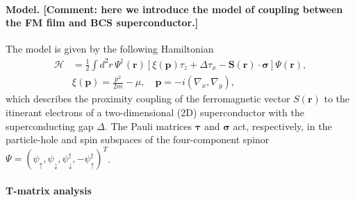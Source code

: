 \documentclass[twocolumn,showpacs,floatfix,nofootinbib,longbibliography]{revtex4-1}
\begin{document}
\paragraph*{Model. [Comment: here we introduce the model of coupling between the FM film and BCS superconductor.]} \label{sec:model}
The model is given by the following Hamiltonian
\begin{align}
	\mathcal H &= \frac{1}{2}\int d^2r\, \Psi^\dagger(\bm r)\left[\xi(\bm p)\tau_z+\Delta \tau_x - \bm S(\bm r)\cdot\bm\sigma\right]\Psi(\bm r), \label{ham} \\
  & \xi(\bm p) = \frac{p^2}{2m}-\mu,\quad \bm p = -i(\nabla_x,\nabla_y),
\end{align}
which describes the proximity coupling of the ferromagnetic vector $S(\bm r)$ to the itinerant electrons of a two-dimensional (2D) superconductor with the superconducting gap $\Delta$. The Pauli matrices $\bm \tau$ and $\bm \sigma$ act, respectively, in the particle-hole and spin subspaces of the four-component spinor $\Psi = (\psi_\uparrow,\psi_\downarrow,\psi^\dagger_\downarrow,-\psi^\dagger_\uparrow)^T$.
\paragraph*{T-matrix analysis} \label{sec:analytics}
\end{document}
